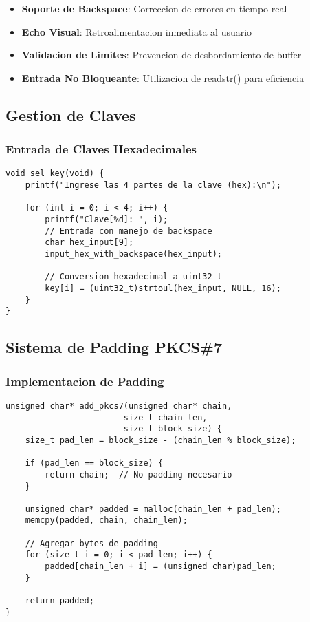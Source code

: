 \documentclass[12pt,a4paper]{article}
\begin{document}
\begin{itemize}
\item \textbf{Soporte de Backspace}: Correccion de errores en tiempo real
\item \textbf{Echo Visual}: Retroalimentacion inmediata al usuario
\item \textbf{Validacion de Limites}: Prevencion de desbordamiento de buffer
\item \textbf{Entrada No Bloqueante}: Utilizacion de readstr() para eficiencia
\end{itemize}

\subsection{Gestion de Claves}

\subsubsection{Entrada de Claves Hexadecimales}
\begin{lstlisting}[caption=Seleccion de Clave]
void sel_key(void) {
    printf("Ingrese las 4 partes de la clave (hex):\n");
    
    for (int i = 0; i < 4; i++) {
        printf("Clave[%d]: ", i);
        // Entrada con manejo de backspace
        char hex_input[9];
        input_hex_with_backspace(hex_input);
        
        // Conversion hexadecimal a uint32_t
        key[i] = (uint32_t)strtoul(hex_input, NULL, 16);
    }
}
\end{lstlisting}

\subsection{Sistema de Padding PKCS\#7}

\subsubsection{Implementacion de Padding}
\begin{lstlisting}[caption=Adicion de Padding]
unsigned char* add_pkcs7(unsigned char* chain, 
                        size_t chain_len, 
                        size_t block_size) {
    size_t pad_len = block_size - (chain_len % block_size);
    
    if (pad_len == block_size) {
        return chain;  // No padding necesario
    }
    
    unsigned char* padded = malloc(chain_len + pad_len);
    memcpy(padded, chain, chain_len);
    
    // Agregar bytes de padding
    for (size_t i = 0; i < pad_len; i++) {
        padded[chain_len + i] = (unsigned char)pad_len;
    }
    
    return padded;
}
\end{lstlisting}
\end{document}
